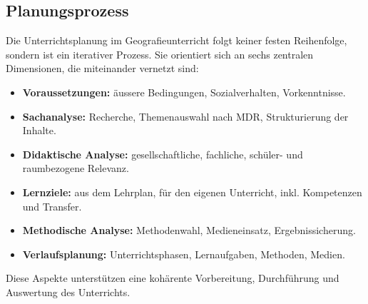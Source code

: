 \subsection{Planungsprozess}

Die Unterrichtsplanung im Geografieunterricht folgt keiner festen Reihenfolge, sondern ist ein iterativer Prozess. Sie orientiert sich an sechs zentralen Dimensionen, die miteinander vernetzt sind:

\begin{itemize}
  \item \textbf{Voraussetzungen:} äussere Bedingungen, Sozialverhalten, Vorkenntnisse.
  \item \textbf{Sachanalyse:} Recherche, Themenauswahl nach MDR, Strukturierung der Inhalte.
  \item \textbf{Didaktische Analyse:} gesellschaftliche, fachliche, schüler- und raumbezogene Relevanz.
  \item \textbf{Lernziele:} aus dem Lehrplan, für den eigenen Unterricht, inkl. Kompetenzen und Transfer.
  \item \textbf{Methodische Analyse:} Methodenwahl, Medieneinsatz, Ergebnissicherung.
  \item \textbf{Verlaufsplanung:} Unterrichtsphasen, Lernaufgaben, Methoden, Medien.
\end{itemize}

Diese Aspekte unterstützen eine kohärente Vorbereitung, Durchführung und Auswertung des Unterrichts.

